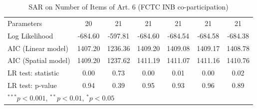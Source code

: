 \begin{table}[!h]
\begin{center}
\begin{tabular}{l c c c c c c }
Parameters              & 20           & 21           & 21           & 21           & 21           & 21           \\
Log Likelihood          & -684.60      & -597.81      & -684.60      & -684.54      & -684.58      & -684.38      \\
AIC (Linear model)      & 1407.20      & 1236.36      & 1409.20      & 1409.08      & 1409.17      & 1408.78      \\
AIC (Spatial model)     & 1409.20      & 1237.62      & 1411.19      & 1411.07      & 1411.16      & 1410.76      \\
LR test: statistic      & 0.00         & 0.73         & 0.00         & 0.01         & 0.00         & 0.02         \\
LR test: p-value        & 0.94         & 0.39         & 0.95         & 0.93         & 0.96         & 0.89         \\
\bottomrule
\multicolumn{7}{l}{\scriptsize{$^{***}p<0.001$, $^{**}p<0.01$, $^*p<0.05$}}
\end{tabular}
\caption{SAR on Number of Items of Art. 6 (FCTC INB co-participation)}
\label{table:coefficients}
\end{center}
\end{table}
